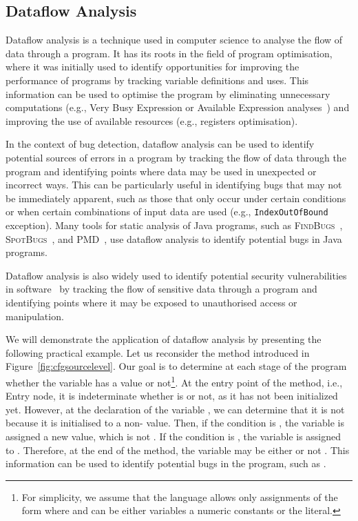 \subsection{Dataflow Analysis}
\label{sec:dataflowanalysis}
Dataflow analysis is a technique used in computer science to analyse the flow of
data through a program. It has its roots in the field of program optimisation,
where it was initially used to identify opportunities for improving the performance
of programs by tracking variable definitions and uses. This information can be used to optimise the program by eliminating
unnecessary computations (e.g., Very Busy Expression or Available Expression
analyses~\cite{aho2007compilers}) and improving
the use of available resources (e.g., registers optimisation).


In the context of bug detection, dataflow analysis can be used to identify
potential sources of errors in a program by tracking the flow of data through
the program and identifying points where data may be used in unexpected or
incorrect ways. This can be particularly useful in identifying bugs that may
not be immediately apparent, such as those that only occur under certain
conditions or when certain combinations of input data are used (e.g., \texttt{IndexOutOfBound} exception).
Many tools for static analysis of Java programs, such as \textsc{FindBugs}~\cite{findbugs},
\textsc{SpotBugs}~\cite{spotbugs}, and \textsc{PMD}~\cite{copeland2005pmd}, use dataflow analysis to identify
potential bugs in Java programs.

Dataflow analysis is also widely used to identify potential security vulnerabilities
in software~\cite{flowDroid} by tracking the flow of sensitive data through a program and
identifying points where it may be exposed to unauthorised access or manipulation.

We will demonstrate the application of dataflow analysis by presenting the following
practical example. Let us reconsider the  method introduced in Figure~\ref{fig:cfgsourcelevel}.
Our goal is to determine at each stage of the program whether the variable  
has a  value or not\footnote{For simplicity, we assume that the language 
allows only assignments of the form  where  and  can 
be either variables a numeric constants or the  literal.}.
 At the entry point of the method, i.e., Entry node,
it is indeterminate whether  is  or not, as it has not been initialized yet.
However, at the declaration of the variable , we can determine that it is
not  because it is initialised to a non-
value. Then, if the condition  is , the
variable  is assigned a new value, which is not . If the condition
is , the variable  is assigned to . Therefore, at the
end of the method, the variable  may be either  or not .
This information can be used to identify potential bugs in the program, such as
.

